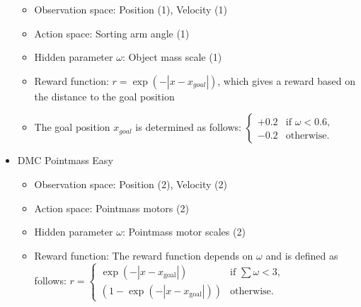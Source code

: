\begin{itemize}
\begin{itemize}
        \item Observation space: Position (1), Velocity (1)
        \item Action space: Sorting arm angle (1)
        \item Hidden parameter $\omega$: Object mass scale (1)
        \item Reward function: $r = \exp{(-|x-x_{goal}|)}$, which gives a reward based on the distance to the goal position
        \item The goal position $x_{goal}$ is determined as follows:
        $\left\{
        \begin{array}{cl}
        +0.2 & \text{if } \omega < 0.6, \\
        -0.2 & \text{otherwise.}
        \end{array}
        \right.$
    \end{itemize}
    \item DMC Pointmass Easy
    \begin{itemize}
        \item Observation space: Position (2), Velocity (2)
        \item Action space: Pointmass motors (2)
        \item Hidden parameter $\omega$: Pointmass motor scales (2)
        \item Reward function: The reward function depends on $\omega$ and is defined as follows: 
        $r =
        \left\{
        \begin{array}{cl}
        \exp{(-|x - x_{\text{goal}}|)} & \text{if } \sum \omega < 3, \\
        (1 - \exp{(-|x - x_{\text{goal}}|)}) & \text{otherwise.}
        \end{array}
        \right.$        
    \end{itemize}
\end{itemize}

